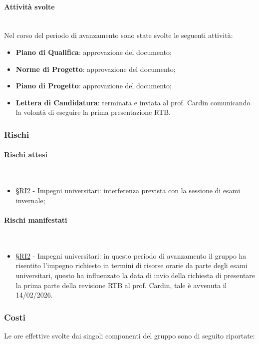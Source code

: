 \documentclass[10pt, letterpaper]{article}
\newcommand{\trisubsection}[1]{\paragraph{#1}\mbox{}\\}
\newcommand{\rif}[1]{\hyperref[#1]{§#1}}
\begin{document}
\trisubsection{Attività svolte}
Nel corso del periodo di avanzamento sono state svolte le seguenti attività:
\begin{itemize}
    \item \textbf{Piano di Qualifica}: approvazione del documento;
    \item \textbf{Norme di Progetto}: approvazione del documento;
    \item \textbf{Piano di Progetto}: approvazione del documento;
    \item \textbf{Lettera di Candidatura}: terminata e inviata al prof. Cardin comunicando la volontà di eseguire la prima presentazione RTB.
\end{itemize}

\subsubsection{Rischi}
\trisubsection{Rischi attesi}
\begin{itemize}
    \item \rif{RI2} - Impegni universitari: interferenza prevista con la sessione di esami invernale;
\end{itemize}
\trisubsection{Rischi manifestati}
\begin{itemize}
    \item \rif{RI2} - Impegni universitari: in questo periodo di avanzamento il gruppo ha risentito l'impegno richiesto in termini 
    di risorse orarie da parte degli esami universitari, questo ha influenzato la data di invio della richiesta di presentare la prima 
    parte della revisione RTB al prof. Cardin, tale è avvenuta il 14/02/2026.
\end{itemize}

\subsubsection{Costi}
Le ore effettive svolte dai singoli componenti del gruppo sono di seguito riportate:

\setRuoloValeria{\Proge}
\setRuoloLeonardo{\Proge}
\setRuoloFilippo{\Resp}
\setRuoloGiuseppe{\Amm}
\setRuoloFrancesco{\Verif}
\setRuoloChristian{\Proge}
\setRuoloLuca{\Verif}


\end{document}
